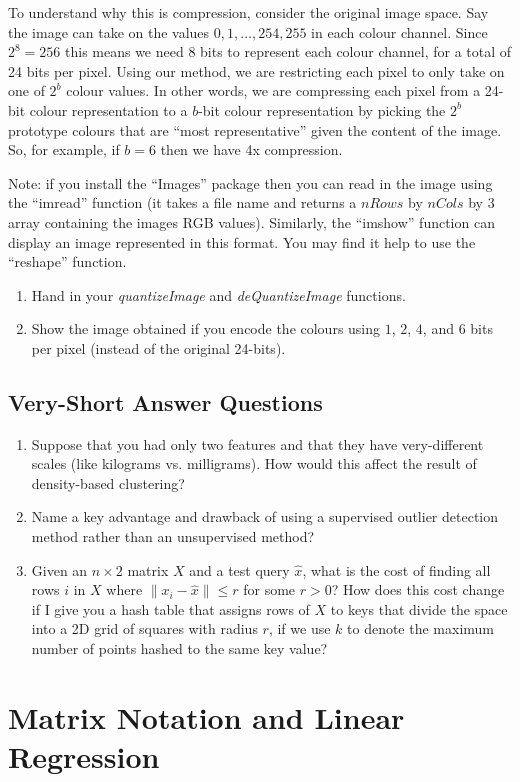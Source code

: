 \documentclass{article}
\def\blu#1{{\color{blu}#1}}
\def\norm#1{\|#1\|}
\def\enum#1{\begin{enumerate}#1\end{enumerate}}
\begin{document}
To understand why this is compression, consider the original image space. Say the image can take on the values $0,1,\ldots,254,255$ in each colour channel. Since $2^8=256$ this means we need 8 bits to represent each colour channel, for a total of 24 bits per pixel. Using our method, we are restricting each pixel to only take on one of $2^b$ colour values. In other words, we are compressing each pixel from a 24-bit colour representation to a $b$-bit colour representation by picking the $2^b$ prototype colours that are ``most representative'' given the content of the image. So, for example, if $b=6$ then we have 4x compression.

Note: if you install the ``Images'' package then you can read in the image using the ``imread'' function (it takes a file name and returns a $nRows$ by $nCols$ by $3$ array containing the images RGB values). Similarly, the ``imshow'' function can display an image represented in this format. You may find it help to use the ``reshape'' function.

\blu{\enum{
\item Hand in your \emph{quantizeImage} and \emph{deQuantizeImage} functions.
\item Show the image obtained if you encode the colours using $1$, $2$, $4$, and $6$ bits per pixel (instead of the original 24-bits).
}}

\subsection{Very-Short Answer Questions}

\blu{
\enum{
\item Suppose that you had only two features and that they have very-different scales (like kilograms vs. milligrams). How would this affect the result of density-based clustering?
\item Name a key advantage and drawback of using a supervised outlier detection method rather than an unsupervised method?
\item Given an $n \times 2$ matrix $X$ and a test query $\hat{x}$, what is the cost of finding all rows $i$ in $X$ where $\norm{x_i - \hat{x}} \leq r$ for some $r > 0$? How does this cost change if I give you a hash table that assigns rows of $X$ to keys that divide the space into a 2D grid of squares with radius $r$, if we use $k$ to denote the maximum number of points hashed to the same key value?
}}

\section{Matrix Notation and Linear Regression}
\end{document}
